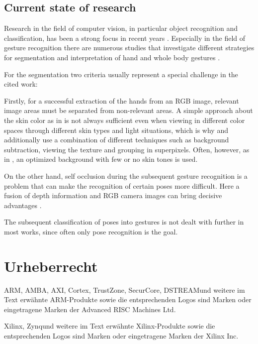 \section{Current state of research}
Research in the field of computer vision, in particular object recognition and classification, has been a strong focus in recent years \cite{FeiFei}. Especially in the field of gesture recognition there are numerous studies that investigate different strategies for segmentation and interpretation of hand and whole body gestures \cite{Zimmermann2017,Sato2001,Supancic2018,Tompson2014,Zhang2016,OhnBar2014,Ge2019,Keskin2012,Li2013,Jones2002}. 


For the segmentation two criteria usually represent a special challenge in the cited work:

Firstly, for a successful extraction of the hands from an RGB image, relevant image areas must be separated from non-relevant areas. A simple approach about the skin color as in \cite{Sato2001} is not always sufficient even when viewing in different color spaces through different skin types and light situations, which is why \cite{Zhang2016} and \cite{Li2013} additionally use a combination of different techniques such as background subtraction, viewing the texture and grouping in superpixels. Often, however, as in \cite{Sridhar2013}, an optimized background with few or no skin tones is used.

On the other hand, self occlusion during the subsequent gesture recognition is a problem that can make the recognition of certain poses more difficult. Here a fusion of depth information and RGB camera images can bring decisive advantages \cite{Keskin2012}.

The subsequent classification of poses into gestures is not dealt with further in most works, since often only pose recognition is the goal.



\cleardoublepage

\chapter*{Urheberrecht}

ARM\TReg, AMBA\TReg, AXI\TTra, Cortex\TTra, TrustZone\TTra, SecurCore\TTra  , DSTREAM\TTra und weitere im Text erwähnte ARM-Produkte sowie die entsprechenden Logos sind Marken oder eingetragene Marken der Advanced RISC Machines Ltd.\par
\vspace{0.5cm}
Xilinx\TReg, Zynq\TTra und weitere im Text erwähnte Xilinx-Produkte sowie die entsprechenden Logos sind Marken oder eingetragene Marken der Xilinx Inc.\par
\vspace{0.5cm}